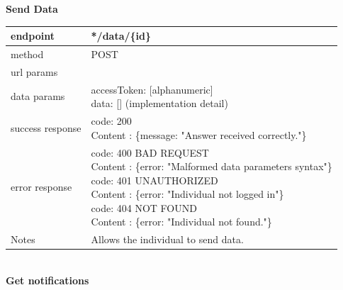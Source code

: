 \begin{legal}
\begin{legal}
\begin{itemize}
								\textbf{Send Data} \\
			
								\begin{tabularx}{\linewidth}{| l | l |}
									\hline
									endpoint & */data/\{id\} \\
									\hline
									method & POST \\
									\hline
									url params & \\
									\hline
									data params &
									\parbox{0.7\textwidth}{
										\bigskip
										accessToken: [alphanumeric]\\
										data: [] (implementation detail)\\
										\bigskip
									} \\
									\hline
									success response &
									\parbox{0.7\textwidth}{
										\bigskip
										code: 200\\
										Content : \{message: "Answer received correctly."\}
										\bigskip
									} \\
									\hline
									error response &
									\parbox{0.7\textwidth}{
										\bigskip
										code: 400 BAD REQUEST \\
										Content : \{error: "Malformed data parameters syntax"\}\\
										code: 401 UNAUTHORIZED \\
										Content : \{error: "Individual not logged in"\}\\
										code: 404 NOT FOUND \\
										Content : \{error: "Individual not found."\}
										\bigskip
									} \\
									\hline
									Notes & 
									\parbox{0.7\textwidth}{
										\bigskip Allows the individual to send data.
									\bigskip}  \\
									\hline
								\end{tabularx}\\
								
								\textbf{Get notifications} \\
			

\end{itemize}
\end{legal}
\end{legal}
